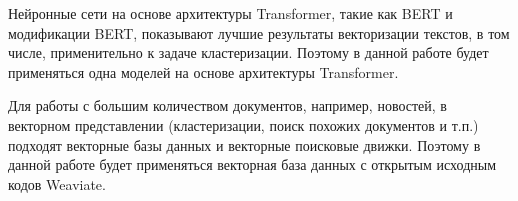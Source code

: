 Нейронные сети на основе архитектуры Transformer, такие как BERT и модификации BERT, показывают лучшие результаты векторизации текстов, в том числе, применительно к задаче кластеризации. Поэтому в данной работе будет применяться одна моделей на основе архитектуры Transformer.

Для работы с большим количеством документов, например, новостей, в векторном представлении (кластеризации, поиск похожих документов и т.п.) подходят векторные базы данных и векторные поисковые движки. Поэтому в данной работе будет применяться векторная база данных с открытым исходным кодов Weaviate.
